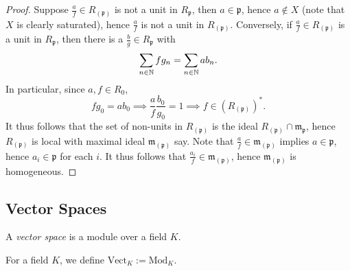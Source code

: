    \begin{proof}
        Suppose $\frac{a}{f}\in R_{(\mathfrak{p})}$ is not a unit in $R_\mathfrak{p}$, then $a\in \mathfrak{p}$, hence $a\notin X$ (note that $X$ is clearly saturated), hence $\frac{a}{f}$ is not a unit in $R_{(\mathfrak{p})}$. Conversely, if $\frac{a}{f}\in R_{(\mathfrak{p})}$ is a unit in $R_\mathfrak{p}$, then there is a $\frac{b}{g}\in R_\mathfrak{p}$ with 
        $$
            \sum_{n\in \mathbb{N}} fg_n = \sum_{n\in \mathbb{N}} ab_n.
        $$
        In particular, since $a,f\in R_0$, 
        $$
            fg_0  = ab_0 \implies \frac{a}{f}\frac{b_0}{g_0}=1 \implies f\in \left(R_{(\mathfrak{p})}\right)^\ast.
        $$
        It thus follows that the set of non-units in $R_{(\mathfrak{p})}$ is the ideal $R_{(\mathfrak{p})}\cap \mathfrak{m}_\mathfrak{p}$, hence $R_{(\mathfrak{p})}$ is local with maximal ideal $\mathfrak{m}_{(\mathfrak{p})}$ say. Note that $\frac{a}{f}\in \mathfrak{m}_{(\mathfrak{p})}$ implies $a\in \mathfrak{p}$, hence $a_i\in \mathfrak{p}$ for each $i$. It thus follows that $\frac{a_i}{f}\in \mathfrak{m}_{(\mathfrak{p})}$, hence $\mathfrak{m}_{(\mathfrak{p})}$ is homogeneous.  
    \end{proof}
\subsection{Vector Spaces}
\begin{definition}
    A \emph{vector space} is a module over a field $K$.
\end{definition}
For a field $K$, we define $\mathrm{Vect}_K:=\mathrm{Mod}_K$.
